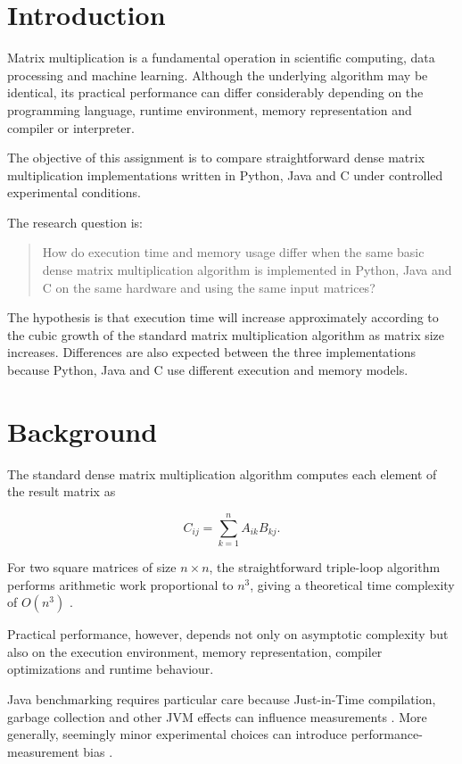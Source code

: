 \documentclass[11pt,a4paper]{article}
\begin{document}
\section{Introduction}

Matrix multiplication is a fundamental operation in scientific computing, data processing and machine learning. Although the underlying algorithm may be identical, its practical performance can differ considerably depending on the programming language, runtime environment, memory representation and compiler or interpreter.

The objective of this assignment is to compare straightforward dense matrix multiplication implementations written in Python, Java and C under controlled experimental conditions.

The research question is:

\begin{quote}
How do execution time and memory usage differ when the same basic dense matrix multiplication algorithm is implemented in Python, Java and C on the same hardware and using the same input matrices?
\end{quote}

The hypothesis is that execution time will increase approximately according to the cubic growth of the standard matrix multiplication algorithm as matrix size increases. Differences are also expected between the three implementations because Python, Java and C use different execution and memory models.

\section{Background}

The standard dense matrix multiplication algorithm computes each element of the result matrix as

\[
C_{ij} = \sum_{k=1}^{n} A_{ik}B_{kj}.
\]

For two square matrices of size $n \times n$, the straightforward triple-loop algorithm performs arithmetic work proportional to $n^3$, giving a theoretical time complexity of $O(n^3)$ \cite{cormen2022}.

Practical performance, however, depends not only on asymptotic complexity but also on the execution environment, memory representation, compiler optimizations and runtime behaviour.

Java benchmarking requires particular care because Just-in-Time compilation, garbage collection and other JVM effects can influence measurements \cite{georges2007}. More generally, seemingly minor experimental choices can introduce performance-measurement bias \cite{mytkowicz2009}.
\end{document}
